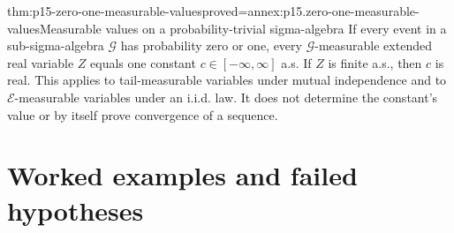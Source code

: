 \begin{hbcorollary}{thm:p15-zero-one-measurable-values}{proved=annex:p15.zero-one-measurable-values}{Measurable values on a probability-trivial sigma-algebra}
If every event in a sub-sigma-algebra \(\mathcal G\) has probability
zero or one, every \(\mathcal G\)-measurable extended real variable
\(Z\) equals one constant \(c\in[-\infty,\infty]\) a.s.
If \(Z\) is finite a.s., then \(c\) is real. This applies to
tail-measurable variables under mutual independence and to
\(\mathcal E\)-measurable variables under an i.i.d. law.
It does not determine the constant's value or by itself prove
convergence of a sequence.
\end{hbcorollary}

\section{Worked examples and failed hypotheses}
\label{sec:p15-zero-one-boundaries}

